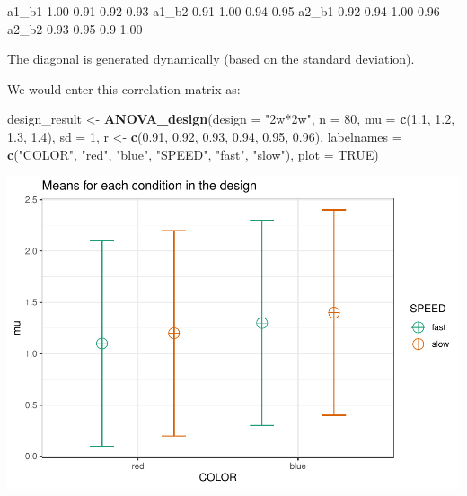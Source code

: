 \documentclass[]{book}
\newenvironment{Shaded}{\begin{snugshade}}{\end{snugshade}}
\newcommand{\DataTypeTok}[1]{\textcolor[rgb]{0.13,0.29,0.53}{#1}}
\newcommand{\DecValTok}[1]{\textcolor[rgb]{0.00,0.00,0.81}{#1}}
\newcommand{\FloatTok}[1]{\textcolor[rgb]{0.00,0.00,0.81}{#1}}
\newcommand{\KeywordTok}[1]{\textcolor[rgb]{0.13,0.29,0.53}{\textbf{#1}}}
\newcommand{\NormalTok}[1]{#1}
\newcommand{\OtherTok}[1]{\textcolor[rgb]{0.56,0.35,0.01}{#1}}
\newcommand{\StringTok}[1]{\textcolor[rgb]{0.31,0.60,0.02}{#1}}
\begin{document}
a1\_b1 1.00 0.91 0.92 0.93
a1\_b2 0.91 1.00 0.94 0.95
a2\_b1 0.92 0.94 1.00 0.96
a2\_b2 0.93 0.95 0.9 1.00

The diagonal is generated dynamically (based on the standard deviation).

We would enter this correlation matrix as:

\begin{Shaded}
\begin{Highlighting}[]
\NormalTok{design_result <-}\StringTok{ }\KeywordTok{ANOVA_design}\NormalTok{(}\DataTypeTok{design =} \StringTok{"2w*2w"}\NormalTok{,}
                              \DataTypeTok{n =} \DecValTok{80}\NormalTok{,}
                              \DataTypeTok{mu =} \KeywordTok{c}\NormalTok{(}\FloatTok{1.1}\NormalTok{, }\FloatTok{1.2}\NormalTok{, }
                                     \FloatTok{1.3}\NormalTok{, }\FloatTok{1.4}\NormalTok{),}
                              \DataTypeTok{sd =} \DecValTok{1}\NormalTok{,}
\NormalTok{                              r <-}\StringTok{ }\KeywordTok{c}\NormalTok{(}\FloatTok{0.91}\NormalTok{, }\FloatTok{0.92}\NormalTok{, }
                                     \FloatTok{0.93}\NormalTok{, }\FloatTok{0.94}\NormalTok{, }
                                     \FloatTok{0.95}\NormalTok{, }\FloatTok{0.96}\NormalTok{),}
                              \DataTypeTok{labelnames =} \KeywordTok{c}\NormalTok{(}\StringTok{"COLOR"}\NormalTok{, }
                                             \StringTok{"red"}\NormalTok{, }\StringTok{"blue"}\NormalTok{, }
                                             \StringTok{"SPEED"}\NormalTok{, }
                                             \StringTok{"fast"}\NormalTok{, }\StringTok{"slow"}\NormalTok{),}
                              \DataTypeTok{plot =} \OtherTok{TRUE}\NormalTok{)}
\end{Highlighting}
\end{Shaded}

\includegraphics{SuperpowerValidation_files/figure-latex/unnamed-chunk-4-1.pdf}
\end{document}
